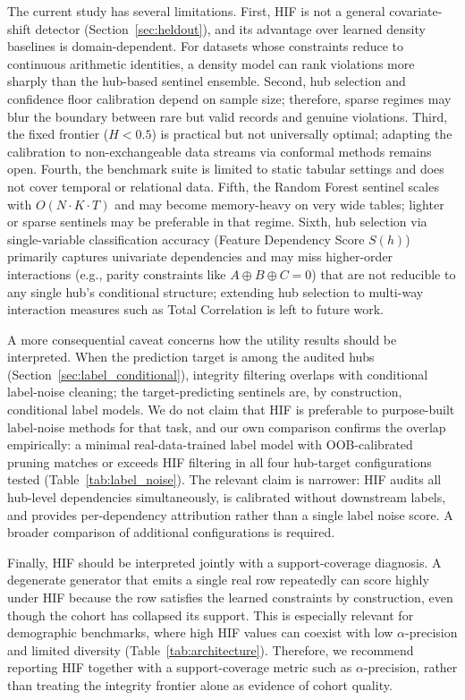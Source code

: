 \documentclass[pdflatex,sn-mathphys-num]{sn-jnl}
\theoremstyle{thmstyleone}%
\theoremstyle{thmstyletwo}%
\theoremstyle{thmstylethree}%
\begin{document}
The current study has several limitations. First, HIF is not a general covariate-shift detector (Section~\ref{sec:heldout}), and its advantage over learned density baselines is domain-dependent. For datasets whose constraints reduce to continuous arithmetic identities, a density model can rank violations more sharply than the hub-based sentinel ensemble. Second, hub selection and confidence floor calibration depend on sample size; therefore, sparse regimes may blur the boundary between rare but valid records and genuine violations. Third, the fixed frontier ($H < 0.5$) is practical but not universally optimal; adapting the calibration to non-exchangeable data streams via conformal methods \cite{barber2023conformal} remains open. Fourth, the benchmark suite is limited to static tabular settings and does not cover temporal or relational data. Fifth, the Random Forest sentinel scales with $O(N \cdot K \cdot T)$ and may become memory-heavy on very wide tables; lighter or sparse sentinels may be preferable in that regime. Sixth, hub selection via single-variable classification accuracy (Feature Dependency Score $S(h)$) primarily captures univariate dependencies and may miss higher-order interactions (e.g., parity constraints like $A \oplus B \oplus C = 0$) that are not reducible to any single hub's conditional structure; extending hub selection to multi-way interaction measures such as Total Correlation is left to future work.

A more consequential caveat concerns how the utility results should be interpreted. When the prediction target is among the audited hubs (Section~\ref{sec:label_conditional}), integrity filtering overlaps with conditional label-noise cleaning; the target-predicting sentinels are, by construction, conditional label models. We do not claim that HIF is preferable to purpose-built label-noise methods for that task, and our own comparison confirms the overlap empirically: a minimal real-data-trained label model with OOB-calibrated pruning matches or exceeds HIF filtering in all four hub-target configurations tested (Table~\ref{tab:label_noise}). The relevant claim is narrower: HIF audits all hub-level dependencies simultaneously, is calibrated without downstream labels, and provides per-dependency attribution rather than a single label noise score. A broader comparison of additional configurations is required.

Finally, HIF should be interpreted jointly with a support-coverage diagnosis. A degenerate generator that emits a single real row repeatedly can score highly under HIF because the row satisfies the learned constraints by construction, even though the cohort has collapsed its support. This is especially relevant for demographic benchmarks, where high HIF values can coexist with low $\alpha$-precision and limited diversity (Table~\ref{tab:architecture}). Therefore, we recommend reporting HIF together with a support-coverage metric such as $\alpha$-precision, rather than treating the integrity frontier alone as evidence of cohort quality.
\end{document}
